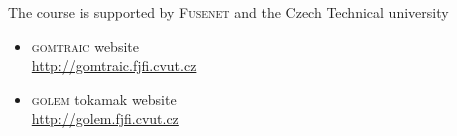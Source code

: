 \documentclass[a4paper,portrait,fontscale=0.65]{baposter}
\begin{document}
\begin{poster}
{
  The course is supported by \textsc{Fusenet} and the Czech Technical university
}
{
  \begin{itemize}
  \item \textsc{gomtraic} website \\ \url{http://gomtraic.fjfi.cvut.cz}
  \item \textsc{golem} tokamak website \\ \url{http://golem.fjfi.cvut.cz}
  \end{itemize}
}
\end{poster}
\end{document}
